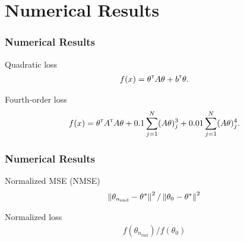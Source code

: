 \section{Numerical Results}
\begin{frame}
\begin{small}
\frametitle{\centering Numerical Results}
\begin{block}{Quadratic loss}
\begin{align}
f(x) = \theta^\mathsf{\scriptscriptstyle T} A \theta + b^\mathsf{\scriptscriptstyle T} \theta.\label{eq:quadratic}
\end{align}
\end{block}
\begin{block}{Fourth-order loss}
\begin{align} 
f(x) = \theta^\mathsf{\scriptscriptstyle T} A^\mathsf{\scriptscriptstyle T} A \theta + 0.1 \sum_{j=1}^N (A\theta)^3_j + 0.01 \sum_{j=1}^N (A\theta)^4_j.\label{eq:4thorder}
 \end{align} 
 \end{block}
 \end{small}
\end{frame}

\begin{frame}
\begin{small}
\frametitle{\centering Numerical Results}
\begin{block}{Normalized MSE (NMSE) }
\begin{align}
\left\| \theta_{n_\text{end}} - \theta^* \right\|^2 / \left\| \theta_0 - \theta^*\right\|^2
\end{align}
\end{block}
\begin{block}{ Normalized loss}
\begin{align} 
f(\theta_{n_\text{end}})/f(\theta_0)
 \end{align} 
 \end{block}
 \end{small}
\end{frame}


